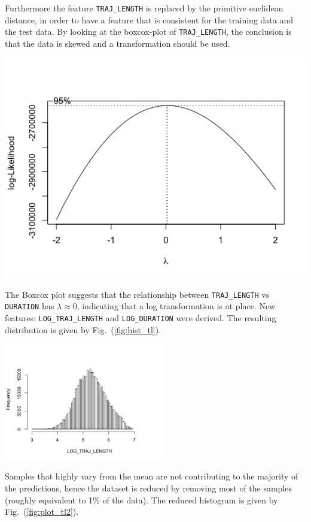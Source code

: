 \documentclass{article}
\newenvironment{Figure}
{\par\medskip\noindent\minipage{\linewidth}}
{\endminipage\par\medskip}
\begin{document}
\begin{multicols}{2}
Furthermore the feature \texttt{TRAJ\_LENGTH} is replaced by the primitive euclidean distance, in order to have a feature that is consistent for the training data and the test data. By looking at the boxcox-plot of \texttt{TRAJ\_LENGTH}, the conclusion is that the data is skewed and a transformation should be used.
\begin{Figure}
    \begin{center}
    \includegraphics[width=\linewidth]{plot_boxcox.png}
    \end{center}
    \label{fig:my_label}
\end{Figure}
 The Boxcox plot suggests that the relationship between \texttt{TRAJ\_LENGTH} vs \texttt{DURATION} has $\lambda \approx 0$, indicating that a log transformation is at place. New features: \texttt{LOG\_TRAJ\_LENGTH} and \texttt{LOG\_DURATION} were derived. The resulting distribution is given by Fig.\ (\ref{fig:hist_tl}).
\begin{Figure}
    \centering
    \includegraphics[width=7cm]{plot_tl.png}
    \label{fig:hist_tl}
\end{Figure}
Samples that highly vary from the mean are not contributing to the majority of the predictions, hence the dataset is reduced by removing most of the samples (roughly equivalent to 1\% of the data). The reduced histogram is given by Fig.\ (\ref{fig:plot_tl2}).


\end{multicols}
\end{document}
